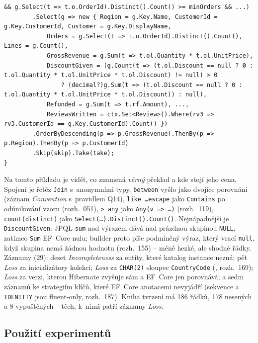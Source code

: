 \documentclass{article}
\begin{document}
\begin{lstlisting}[language={[Sharp]C},caption={Příklad 3, výstup (výňatek): metoda dotazu v~LINQ pro EF Core.},label={lst:ex3-out}]
            && g.Select(t => t.o.OrderId).Distinct().Count() >= minOrders && ...)
        .Select(g => new { Region = g.Key.Name, CustomerId = g.Key.CustomerId, Customer = g.Key.DisplayName,
            Orders = g.Select(t => t.o.OrderId).Distinct().Count(), Lines = g.Count(),
            GrossRevenue = g.Sum(t => t.ol.Quantity * t.ol.UnitPrice),
            DiscountGiven = (g.Count(t => (t.ol.Discount == null ? 0 : t.ol.Quantity * t.ol.UnitPrice * t.ol.Discount) != null) > 0
                ? (decimal?)g.Sum(t => (t.ol.Discount == null ? 0 : t.ol.Quantity * t.ol.UnitPrice * t.ol.Discount)) : null),
            Refunded = g.Sum(t => t.rf.Amount), ...,
            ReviewsWritten = ctx.Set<Review>().Where(rv3 => rv3.CustomerId == g.Key.CustomerId).Count() })
        .OrderByDescending(p => p.GrossRevenue).ThenBy(p => p.Region).ThenBy(p => p.CustomerId)
        .Skip(skip).Take(take);
}
\end{lstlisting}

Na tomto příkladu je vidět, co znamená \emph{věrný} překlad a kde stojí jeho cena. Spojení je řetěz \texttt{Join} s~anonymními typy, \texttt{between} vyšlo jako dvojice porovnání (záznam \emph{Convention} s~pravidlem Q14), \texttt{like \ldots escape} jako \texttt{Contains} po odúnikování vzoru (rozh.~051), \texttt{> any} jako \texttt{Any(v => \ldots)} (rozh.~119), \texttt{count(distinct)} jako \texttt{Select(\ldots).Distinct().Count()}. Nejnápadnější je \texttt{DiscountGiven}: JPQL \texttt{sum} nad výrazem dává nad prázdnou skupinou \texttt{NULL}, zatímco \texttt{Sum} EF~Core nulu; builder proto píše podmíněný výraz, který vrací \texttt{null}, když skupina nemá žádnou hodnotu (rozh.~155) -- méně hezké, ale shodné řádky. Záznamy (29): deset \emph{Incompleteness} za entity, které katalog instance nezná; pět \emph{Loss} za inicializátory kolekcí; \emph{Loss} za \texttt{CHAR(2)} sloupec \texttt{CountryCode} (, rozh.~169); \emph{Loss} za verzi, kterou Hibernate zvyšuje sám a EF~Core jen porovnává; a sedm záznamů ke strategiím klíčů, které EF~Core anotacemi nevyjádří (sekvence a \texttt{IDENTITY} jsou fluent-only, rozh.~187). Kniha tvrzení má 186 řádků, 178 nesených a 8 vypuštěných -- těch, k~nimž patří záznamy \emph{Loss}.

\subsection{Použití experimentů}\label{sec:exp-navod}
\end{document}
